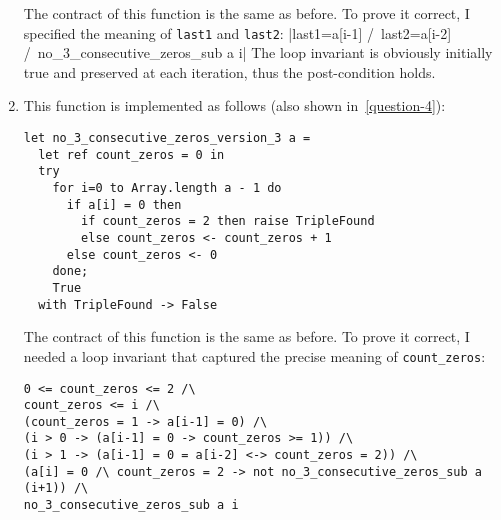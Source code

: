 \documentclass[a4paper]{article}
\begin{document}
\begin{enumerate}
  The contract of this function is the same as before.
  To prove it correct, I specified the meaning of \texttt{last1} and
  \texttt{last2}:
  |last1=a[i-1] /\ last2=a[i-2] /\ no_3_consecutive_zeros_sub a i|
  The loop invariant is obviously initially true and preserved at each
  iteration, thus the post-condition holds.


\item This function is implemented as follows (also shown in~\ref{question-4}):
\begin{verbatim}
let no_3_consecutive_zeros_version_3 a =
  let ref count_zeros = 0 in
  try
    for i=0 to Array.length a - 1 do
      if a[i] = 0 then
        if count_zeros = 2 then raise TripleFound
        else count_zeros <- count_zeros + 1
      else count_zeros <- 0
    done;
    True
  with TripleFound -> False
\end{verbatim}
  The contract of this function is the same as before.
  To prove it correct, I needed a loop invariant that captured the precise
  meaning of \texttt{count\_zeros}:
\begin{verbatim}
0 <= count_zeros <= 2 /\
count_zeros <= i /\
(count_zeros = 1 -> a[i-1] = 0) /\
(i > 0 -> (a[i-1] = 0 -> count_zeros >= 1)) /\
(i > 1 -> (a[i-1] = 0 = a[i-2] <-> count_zeros = 2)) /\
(a[i] = 0 /\ count_zeros = 2 -> not no_3_consecutive_zeros_sub a (i+1)) /\
no_3_consecutive_zeros_sub a i
\end{verbatim}

\end{enumerate}

\newpage

\appendix

\end{document}
